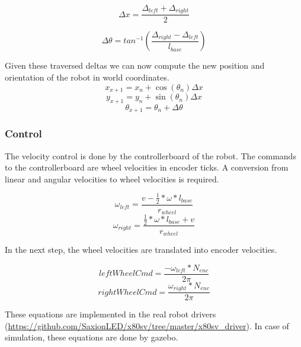 \documentclass[a4paper]{article}
\begin{document}
\begin{equation}
\Delta x = \frac{\Delta_{left} + \Delta_{right}}{2}
\end{equation}

\begin{equation}
\Delta \theta = tan^{-1}(\frac{\Delta_{right} - \Delta_{left}}{l_{base}})
\end{equation}

Given these traversed deltas we can now compute the new position and orientation
of the robot in world coordinates.
\begin{equation}
 x_{x+1} = x_{n} + \cos(\theta_n) \Delta x
\end{equation}
\begin{equation}
 y_{x+1} = y_{n} + \sin(\theta_n) \Delta x
\end{equation}
\begin{equation}
 \theta_{x+1} = \theta_{n} + \Delta \theta
\end{equation}

\subsubsection{Control}

The velocity control is done by the controllerboard of the robot. The commands to
the controllerboard are wheel velocities in encoder ticks. A conversion from linear
and angular velocities to wheel velocities is required.

\begin{equation}
        \omega_{left} = \frac{v - \frac{1}{2} * \omega * l_{base}}{r_{wheel}}
\end{equation}
\begin{equation}
        \omega_{right} = \frac{\frac{1}{2} * \omega * l_{base} + v}{r_{wheel}}
\end{equation}

In the next step, the wheel velocities are translated into encoder velocities.

\begin{equation}
  leftWheelCmd = \frac{- \omega_{left} * N_{enc}}{2 \pi}
\end{equation}
\begin{equation}
 rightWheelCmd = \frac{\omega_{right} * N_{enc}}{2 \pi}
\end{equation}

These equations are implemented in the real robot drivers (\url{https://github.com/SaxionLED/x80sv/tree/master/x80sv_driver}). In case of simulation, these equations are done by gazebo.
\end{document}
